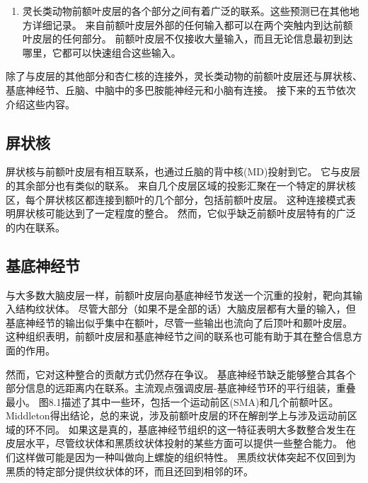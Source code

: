 \begin{enumerate}
\item 灵长类动物前额叶皮层的各个部分之间有着广泛的联系。这些预测已在其他地方详细记录\cite{barbas1988anatomic,carmichael1995sensory,barbas1999medial,petrides1999dorsolateral,petrides2002association,price1999delineating}。
来自前额叶皮层外部的任何输入都可以在两个突触内到达前额叶皮层的任何部分\cite{averbeck2008statistical}。
前额叶皮层不仅接收大量输入，而且无论信息最初到达哪里，它都可以快速组合这些输入。
\end{enumerate}
\par


除了与皮层的其他部分和杏仁核的连接外，灵长类动物的前额叶皮层还与屏状核、基底神经节、丘脑、中脑中的多巴胺能神经元和小脑有连接。
接下来的五节依次介绍这些内容。



\subsection{屏状核}
\par

屏状核与前额叶皮层有相互联系\cite{tanne2002projections}，也通过丘脑的背中核(MD)投射到它\cite{erickson2004subcortical}。
它与皮层的其余部分也有类似的联系。
来自几个皮层区域的投影汇聚在一个特定的屏状核区，每个屏状核区都连接到额叶的几个部分，包括前额叶皮层\cite{tanne2002projections}。
这种连接模式表明屏状核可能达到了一定程度的整合。
然而，它似乎缺乏前额叶皮层特有的广泛的内在联系。



\subsection{基底神经节}
\par

与大多数大脑皮层一样，前额叶皮层向基底神经节发送一个沉重的投射，靶向其输入结构纹状体。
尽管大部分（如果不是全部的话）大脑皮层都有大量的输入，但基底神经节的输出似乎集中在额叶，尽管一些输出也流向了后顶叶\cite{clower2005basal}和颞叶皮层\cite{middleton1996temporal}。
这种组织表明，前额叶皮层和基底神经节之间的联系也可能有助于其在整合信息方面的作用。
\par


然而，它对这种整合的贡献方式仍然存在争议。
基底神经节缺乏能够整合其各个部分信息的远距离内在联系。主流观点强调皮层-基底神经节环的平行组装，重叠最小\cite{alexander1991basal,nakano2000neural}。
图8.1描述了其中一些环，包括一个运动前区(SMA)和几个前额叶区。
Middleton\cite{middleton2000basal}得出结论，总的来说，涉及前额叶皮层的环在解剖学上与涉及运动前区域的环不同。
如果这是真的，基底神经节组织的这一特征表明大多数整合发生在皮层水平，尽管纹状体和黑质纹状体投射的某些方面可以提供一些整合能力。
他们这样做可能是因为一种叫做向上螺旋的组织特性\cite{haber2000striatonigrostriatal}。
黑质纹状体突起不仅回到为黑质的特定部分提供纹状体的环，而且还回到相邻的环。



